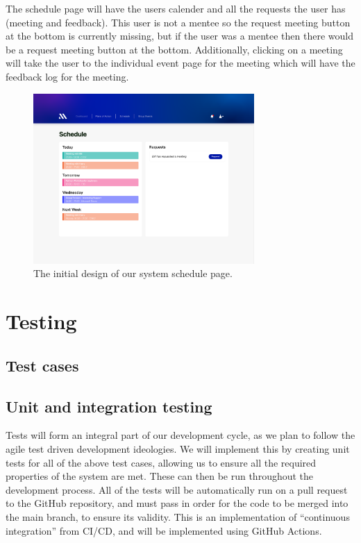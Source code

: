 \documentclass[10pt]{article}
\begin{document}
The schedule page will have the users calender and all the requests the user has
(meeting and feedback). This user is not a mentee so the request meeting button
at the bottom is currently missing, but if the user was a mentee then there
would be a request meeting button at the bottom. Additionally, clicking on a
meeting will take the user to the individual event page for the meeting which
will have the feedback log for the meeting.

\begin{figure}[H]
    \centering
    \includegraphics[width=0.75\textwidth]{Schedule}
    \caption{The initial design of our system schedule page.}
    \label{fig:dashboard_design}
\end{figure}

\section{Testing}
\subsection{Test cases}
\subsection{Unit and integration testing}
Tests will form an integral part of our development cycle, as we plan to follow
the agile test driven development ideologies. We will implement this by creating
unit tests for all of the above test cases, allowing us to ensure all the
required properties of the system are met. These can then be run throughout the
development process. All of the tests will be automatically run on a pull
request to the GitHub repository, and must pass in order for the code to be
merged into the main branch, to ensure its validity. This is an implementation
of “continuous integration” from CI/CD, and will be implemented using GitHub
Actions.
\end{document}
